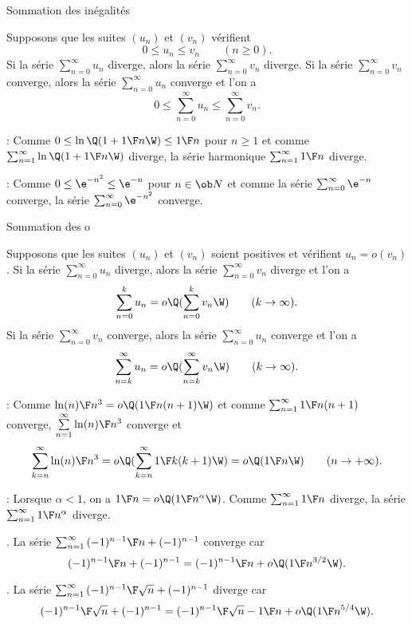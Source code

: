 \Concept Sommation des in\'egalit\'es

Supposons que les suites $(u_n)$ et $(v_n)$ v\'erifient 
$$
0\le u_n\le v_n\qquad(n\ge0).
$$ 
Si la s\'erie $\sum_{n=0}^\infty u_n$ diverge, alors la s\'erie $\sum_{n=0}^\infty v_n$ diverge. \pn
Si la s\'erie $\sum_{n=0}^\infty v_n$ converge, alors la s\'erie $\sum_{n=0}^\infty u_n$ converge et l'on a 
$$
0\le \sum_{n=0}^\infty u_n\le\sum_{n=0}^\infty v_n. 
$$ 

\Application : Comme $0\le \ln\Q(1+{1\F n}\W)\le {1\F n}$ pour $n\ge1$ 
et comme $\sum_{n=1}^\infty\ln\Q(1+{1\F n}\W)$ diverge, la s\'erie harmonique 
$\sum_{n=1}^\infty{1\F n}$ diverge. 
\bigskip


\Application : Comme $0\le \e^{-n^2}\le \e^{-n}$ pour $n\in\ob N$ et comme la s\'erie $\sum_{n=0}^\infty\e^{-n}$ converge, 
la s\'erie $\sum_{n=0}^\infty\e^{-n^2}$ converge. 
\bigskip

\Concept Sommation des o

Supposons que les suites $(u_n)$ et $(v_n)$ soient positives et v\'erifient $u_n=o(v_n)$. \pn 
Si la s\'erie $\sum_{n=0}^\infty u_n$ diverge, alors la s\'erie $\sum_{n=0}^\infty v_n$ diverge et l'on a 
$$
\sum\limits_{n=0}^ku_n=o\Q(\sum\limits_{n=0}^kv_n\W)\qquad(k\to\infty). 
$$
Si la s\'erie $\sum_{n=0}^\infty v_n$ converge, alors la s\'erie $\sum_{n=0}^\infty u_n$ converge 
et l'on a 
$$
\sum\limits_{n=k}^\infty u_n=o\Q(\sum\limits_{n=k}^\infty v_n\W)\qquad(k\to\infty). 
$$ 

\Application : Comme ${\ln(n)\F n^3}=o\Q({1\F n(n+1)}\W)$ et comme $\sum_{n=1}^\infty{1\F n(n+1)}$ converge, 
$\sum\limits_{n=1}^\infty{\ln(n)\F n^3}$ converge et 
$$
\sum\limits_{k=n}^\infty{\ln(n)\F n^3}=o\Q(\sum\limits_{k=n}^\infty{1\F k(k+1)}\W)=o\Q({1\F n}\W)\qquad (n\to+\infty).
$$


\Application : Lorsque $\alpha<1$, on a ${1\F n}=o\Q({1\F n^\alpha}\W)$. Comme $\sum_{n=1}^\infty{1\F n}$ diverge, 
la s\'erie $\sum_{n=1}^\infty{1\F n^\alpha}$ diverge. 
\bigskip


\Exemple. La s\'erie $\sum_{n=1}^\infty{(-1)^{n-1}\F n+(-1)^{n-1}}$ converge car 
$$
{(-1)^{n-1}\F n+(-1)^{n-1}}={(-1)^{n-1}\F n}+o\Q(1\F n^{3/2}\W). 
$$

\Exemple. La s\'erie $\sum_{n=1}^\infty{(-1)^{n-1}\F\sqrt n+(-1)^{n-1}}$ diverge car 
$$
{(-1)^{n-1}\F\sqrt n+(-1)^{n-1}}={(-1)^{n-1}\F\sqrt n}-{1\F n}+o\Q({1\F n^{5/4}}\W). 
$$


